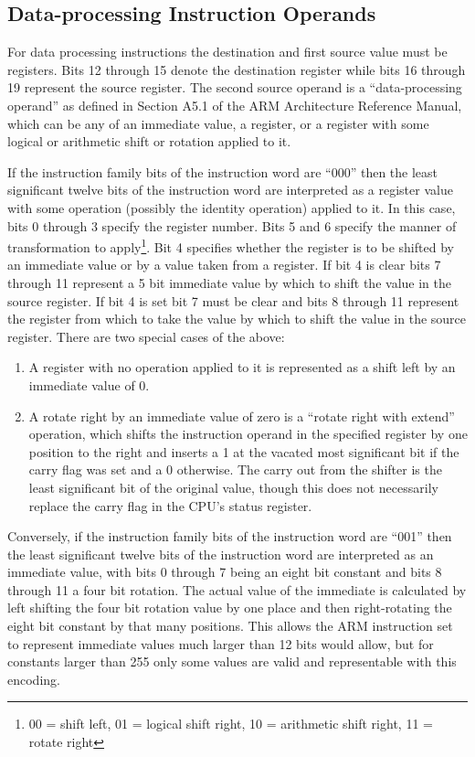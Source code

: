 \subsection{Data-processing Instruction Operands}
\label{sec:appendix:opcodes:operands}

For data processing instructions the destination and first source value must be registers. Bits 12 through 15 denote the destination register while bits 16 through 19 represent the source register. The second source operand is a ``data-processing operand'' as defined in Section A5.1 of the ARM Architecture Reference Manual\citep[pp. A5-2]{armarm:2005}, which can be any of an immediate value, a register, or a register with some logical or arithmetic shift or rotation applied to it.

If the instruction family bits of the instruction word are ``000'' then the least significant twelve bits of the instruction word are interpreted as a register value with some operation (possibly the identity operation) applied to it. In this case, bits 0 through 3 specify the register number. Bits 5 and 6 specify the manner of transformation to apply\footnote{00 = shift left, 01 = logical shift right, 10 = arithmetic shift right, 11 = rotate right}. Bit 4 specifies whether the register is to be shifted by an immediate value or by a value taken from a register. If bit 4 is clear bits 7 through 11 represent a 5 bit immediate value by which to shift the value in the source register. If bit 4 is set bit 7 must be clear and bits 8 through 11 represent the register from which to take the value by which to shift the value in the source register. There are two special cases of the above:

\begin{enumerate}
    \item A register with no operation applied to it is represented as a shift left by an immediate value of 0.
    \item A rotate right by an immediate value of zero is a ``rotate right with extend'' operation, which shifts the instruction operand in the specified register by one position to the right and inserts a 1 at the vacated most significant bit if the carry flag was set and a 0 otherwise. The carry out from the shifter is the least significant bit of the original value, though this does not necessarily replace the carry flag in the CPU's status register.
\end{enumerate}

Conversely, if the instruction family bits of the instruction word are ``001'' then the least significant twelve bits of the instruction word are interpreted as an immediate value, with bits 0 through 7 being an eight bit constant and bits 8 through 11 a four bit rotation. The actual value of the immediate is calculated by left shifting the four bit rotation value by one place and then right-rotating the eight bit constant by that many positions. This allows the ARM instruction set to represent immediate values much larger than 12 bits would allow, but for constants larger than 255 only some values are valid and representable with this encoding.

